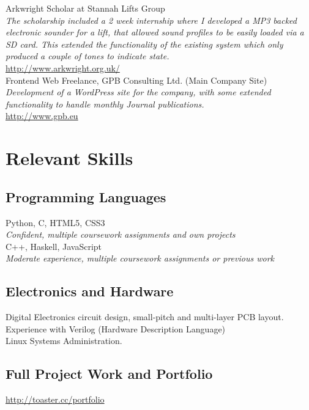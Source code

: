 \documentclass[10pt, a4paper]{article}
\newcommand{\years}[1]{\marginnote{\scriptsize #1}}
\begin{document}
\years{2012} Arkwright Scholar at Stannah Lifts Group \\
\emph{The scholarship included a 2 week internship where I developed a MP3 backed electronic sounder for a lift, 
  that allowed sound profiles to be easily loaded via a SD card. This extended the functionality of the 
  existing system which only produced a couple of tones to indicate state.} \\
\href{http://www.arkwright.org.uk/}{http://www.arkwright.org.uk/}\\

\years{2011-2012} Frontend Web Freelance, GPB Consulting Ltd. (Main Company Site) \\
\emph{Development of a WordPress site for the company, with some extended functionality to handle 
  monthly Journal publications.}\\
\href{http://www.gpb.eu}{http://www.gpb.eu}

\section*{Relevant Skills}

\subsection*{Programming Languages}

Python, C, HTML5, CSS3 \\
\emph{Confident, multiple coursework assignments and own projects}\\
C++, Haskell, JavaScript\\
\emph{Moderate experience, multiple coursework assignments or previous work}

\subsection*{Electronics and Hardware}

Digital Electronics circuit design, small-pitch and multi-layer PCB layout.\\
Experience with Verilog (Hardware Description Language)\\
Linux Systems Administration.

\subsection*{Full Project Work and Portfolio}

\href{http://toaster.cc/portfolio}{http://toaster.cc/portfolio}
\end{document}
